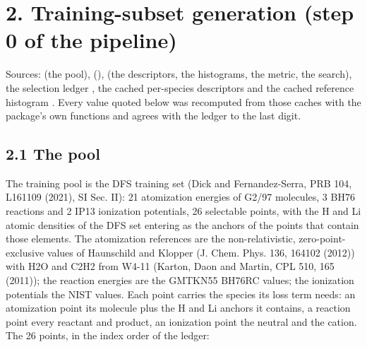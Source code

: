 \documentclass[10pt,a4paper]{article}
\begin{document}
\section*{2. Training-subset generation (step 0 of the pipeline)}

Sources:  (the pool),  (),  (the descriptors, the histograms, the metric, the search), the selection ledger , the cached per-species descriptors  and the cached reference histogram . Every value quoted below was recomputed from those caches with the package's own functions and agrees with the ledger to the last digit.

\subsection*{2.1 The pool}

The training pool is the DFS training set (Dick and Fernandez-Serra, PRB 104, L161109 (2021), SI Sec. II): 21 atomization energies of G2/97 molecules, 3 BH76 reactions and 2 IP13 ionization potentials, 26 selectable points, with the H and Li atomic densities of the DFS set entering as the anchors of the points that contain those elements. The atomization references are the non-relativistic, zero-point-exclusive values of Haunschild and Klopper (J. Chem. Phys. 136, 164102 (2012)) with H2O and C2H2 from W4-11 (Karton, Daon and Martin, CPL 510, 165 (2011)); the reaction energies are the GMTKN55 BH76RC values; the ionization potentials the NIST values. Each point carries the species its loss term needs: an atomization point its molecule plus the H and Li anchors it contains, a reaction point every reactant and product, an ionization point the neutral and the cation. The 26 points, in the index order of the ledger:
\end{document}
